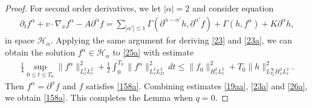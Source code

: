 \documentclass[reqno,a4paper]{amsart}
\numberwithin{equation}{section}
\newcommand{\1}{\mathbf{1}}
\newcommand{\<}{\langle}
\renewcommand{\>}{\rangle}
\begin{document}
\begin{proof}
 For second order derivatives, we let $|\alpha|=2$ and consider equation 
	\begin{align}\label{25a}
	\partial_tf^{\alpha} + v\cdot \nabla_xf^{\alpha}  - A \partial^{\alpha} f = \sum_{|\alpha'|\le 1}\Gamma(\partial^{\alpha-\alpha'} h,\partial^{\alpha'}f)+\Gamma(h,f^{\alpha} )+ K\partial^{\alpha} h,
\end{align}
in space $\mathcal{H}_\alpha$. 
Applying the same argument for deriving \eqref{23} and \eqref{23a}, we can obtain the solution $f^{\alpha}\in\mathcal{H}_\alpha$ to \eqref{25a} with estimate
\begin{align}\label{26a}
		\frac{1}{4}\sup_{0\le t\le T_0}\|f^{\alpha}\|^2_{L^2_xL^2_v} +  \frac{1}{2}\int^{T_0}_0\|f^{\alpha}\|_{L^2_xL^2_D}^2\,dt 
	\le\|f_0\|^2_{H^2_xL^2_v} + T_0\|h\|^2_{L^\infty_{T_0}H^2_xL^2_v}. 
\end{align}
Then $f^{\alpha}=\partial^{\alpha} f$ and $f$ satisfies \eqref{158a}. Combining estimates \eqref{19aa}, \eqref{23a} and \eqref{26a}, we obtain \eqref{158a}. 
 This completes the Lemma when $q=0$.


\end{proof}
\end{document}
